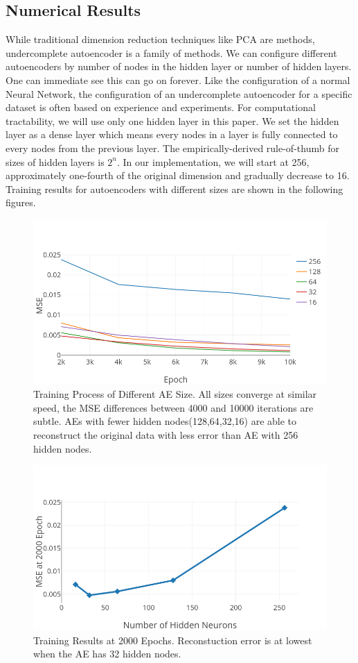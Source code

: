 \documentclass[11pt,a4paper]{article}
\theoremstyle{definition}
\numberwithin{equation}{section}
\begin{document}
	\subsection{Numerical Results}\label{sec:data_ana_res}
	While traditional dimension reduction techniques like PCA are methods, undercomplete autoencoder is a family of methods. We can configure different autoencoders by number of nodes in the hidden layer or number of hidden layers. One can immediate see this can go on forever. Like the configuration of a normal Neural Network, the configuration of an undercomplete autoencoder for a specific dataset is often based on experience and experiments. For computational tractability, we will use only one hidden layer in this paper. We set the hidden layer as a dense layer which means every nodes in a layer is fully connected to every nodes from the previous layer. The empirically-derived rule-of-thumb for sizes of hidden layers is $2^n$. In our implementation, we will start at 256, approximately one-fourth of the original dimension and gradually decrease to 16. Training results for autoencoders with different sizes are shown in the following figures.
	\begin{figure}[h!]
		\centering
		\includegraphics[width=.8\textwidth]{ae_mse.png}
		\caption{Training Process of Different AE Size. All sizes converge at similar speed, the MSE differences between 4000 and 10000 iterations are subtle. AEs with fewer hidden nodes(128,64,32,16) are able to reconstruct the original data with less error than AE with 256 hidden nodes.}
		\label{ae_res}
	\end{figure}
	
	\begin{figure}[h!]
		\centering
		\includegraphics[width=.8\textwidth]{ae_compare.png}
		\caption{Training Results at 2000 Epochs. Reconstuction error is at lowest when the AE has 32 hidden nodes. }
		\label{ae_res_1}
	\end{figure}
	
\end{document}
